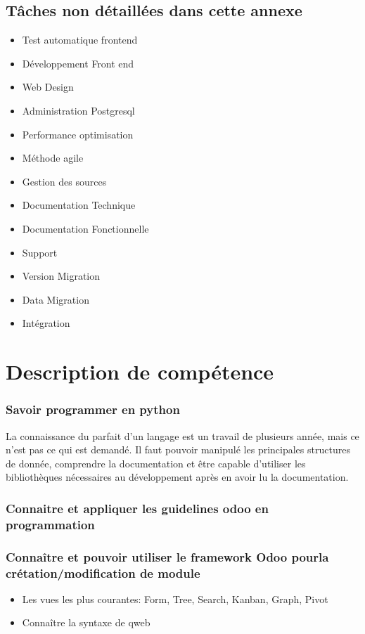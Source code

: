 \subsection{Tâches non détaillées dans cette annexe}
\begin{itemize}
 \item Test automatique frontend
 \item Développement Front end
 \item Web Design
 \item Administration Postgresql
 \item Performance optimisation
 \item Méthode agile
 \item Gestion des sources
 \item Documentation Technique
 \item Documentation Fonctionnelle
 \item Support
 \item Version Migration
 \item Data Migration
 \item Intégration
\end{itemize}

\section{Description de compétence}
\subsubsection{Savoir programmer en python}
La connaissance du parfait d'un langage est un travail de plusieurs année, mais ce n'est pas ce qui est demandé. Il faut pouvoir manipulé les principales structures de donnée, comprendre la documentation et être capable d'utiliser les bibliothèques nécessaires au développement après en avoir lu la documentation. 
\subsubsection{Connaitre et appliquer les guidelines odoo en programmation}



\subsubsection{Connaître et pouvoir utiliser le framework Odoo pourla crétation/modification de module}
\begin{itemize}
 \item Les vues les plus courantes: Form, Tree, Search, Kanban, Graph, Pivot
 \item Connaître la syntaxe de qweb
\end{itemize}
